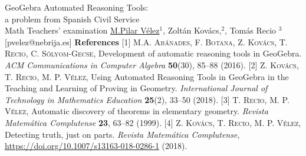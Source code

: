 \begin{abstract_online}{GeoGebra Automated Reasoning Tools: \\ a problem from Spanish Civil Service \\ Math Teachers' examination}{%
        \underline{M.Pilar V\'elez}$^{1}$, Zolt\'an Kov\'acs,$^{2}$, Tom\'as Recio $^{3}$}{[pvelez@nebrija.es]
        }
\textbf{References} \newline{}
[1] \textsc{M.A. Ab\'anades, F. Botana, Z. Kov\'acs, T. Recio, C. S\'olyom-Gecse}, Development of automatic reasoning tools in GeoGebra. \emph{ACM Communications in Computer Algebra} \textbf{50}(30), 85--88  (2016). \newline{}
 [2] \textsc{Z. Kov\'acs, T. Recio, M. P. V\'elez}, Using Automated Reasoning Tools in GeoGebra in the Teaching and Learning of Proving in Geometry. \emph{International Journal of Technology in Mathematics Education} \textbf{25}(2), 33--50  (2018). \newline{}
 [3] \textsc{T. Recio, M. P. V\'elez}, Automatic discovery of theorems in elementary geometry. \emph{Revista Matem\'atica Complutense} \textbf{23}, 63--82 (1999). \newline{}
 [4] \textsc{Z. Kov\'acs, T. Recio, M. P. V\'elez}, Detecting truth, just on parts. \emph{Revista Matem\'atica Complutense},
\url{https://doi.org/10.1007/s13163-018-0286-1} (2018). \newline{}
\end{abstract_online}
    
